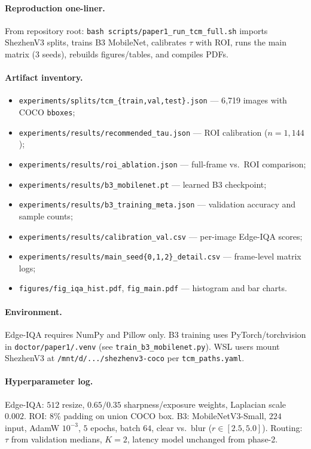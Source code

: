 \paragraph{Reproduction one-liner.}
From repository root: \texttt{bash scripts/paper1\_run\_tcm\_full.sh} imports ShezhenV3 splits, trains B3 MobileNet, calibrates $\tau$ with ROI, runs the main matrix (3 seeds), rebuilds figures/tables, and compiles PDFs.

\paragraph{Artifact inventory.}
\begin{itemize}
  \item \texttt{experiments/splits/tcm\_\{train,val,test\}.json} --- 6{,}719 images with COCO \texttt{bboxes};
  \item \texttt{experiments/results/recommended\_tau.json} --- ROI calibration ($n{=}1{,}144$);
  \item \texttt{experiments/results/roi\_ablation.json} --- full-frame vs.\ ROI comparison;
  \item \texttt{experiments/results/b3\_mobilenet.pt} --- learned B3 checkpoint;
  \item \texttt{experiments/results/b3\_training\_meta.json} --- validation accuracy and sample counts;
  \item \texttt{experiments/results/calibration\_val.csv} --- per-image Edge-IQA scores;
  \item \texttt{experiments/results/main\_seed\{0,1,2\}\_detail.csv} --- frame-level matrix logs;
  \item \texttt{figures/fig\_iqa\_hist.pdf}, \texttt{fig\_main.pdf} --- histogram and bar charts.
\end{itemize}

\paragraph{Environment.}
Edge-IQA requires NumPy and Pillow only.
B3 training uses PyTorch/torchvision in \texttt{doctor/paper1/.venv} (see \texttt{train\_b3\_mobilenet.py}).
WSL users mount ShezhenV3 at \texttt{/mnt/d/.../shezhenv3-coco} per \texttt{tcm\_paths.yaml}.

\paragraph{Hyperparameter log.}
Edge-IQA: $512$ resize, $0.65/0.35$ sharpness/exposure weights, Laplacian scale $0.002$.
ROI: $8\%$ padding on union COCO box.
B3: MobileNetV3-Small, $224$ input, AdamW $10^{-3}$, $5$ epochs, batch $64$, clear vs.\ blur ($r{\in}[2.5,5.0]$).
Routing: $\tau$ from validation medians, $K{=}2$, latency model unchanged from phase-2.

